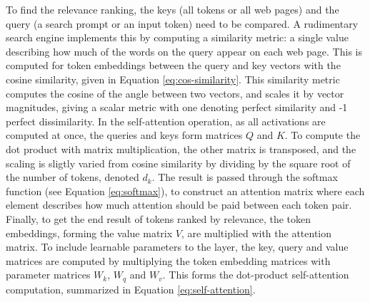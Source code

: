 \documentclass{article}
\begin{document}
To find the relevance ranking, the keys (all tokens or all web pages) and the query (a search prompt or an input token)
need to be compared. A rudimentary search engine implements this by computing a similarity metric:
a single value describing how much of the words on the query appear on each web page. This is computed for token embeddings
between the query and key vectors with the cosine similarity, given in Equation \ref{eq:cos-similarity}. This similarity metric computes the 
cosine of the angle between two vectors, and scales it by vector magnitudes,
 giving a scalar metric with one denoting perfect similarity and -1 perfect dissimilarity.
 In the self-attention operation, as all activations are computed at once, the queries and keys form matrices $Q$ and $K$. 
 To compute the dot product with matrix multiplication, the other matrix is transposed, and the scaling is 
 sligtly varied from cosine similarity by dividing by the square root of the number of tokens, denoted $d_k$. The 
 result is passed through the softmax function (see Equation \ref{eq:softmax}), to construct an attention matrix where 
 each element describes how much attention should be paid between each token pair. Finally, to get the end result of 
 tokens ranked by relevance, the token embeddings, forming the value matrix $V$, are multiplied with the attention matrix. To include learnable parameters to the layer, 
 the key, query and value matrices are computed by multiplying 
 the token embedding matrices with parameter matrices $W_k$, $W_ q$ and $W_v$. This forms the dot-product self-attention computation, summarized in Equation \ref{eq:self-attention}.
 
\end{document}
